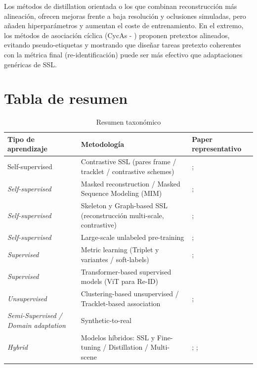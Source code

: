 Los métodos de distillation orientada o los que combinan reconstrucción más alineación, ofrecen mejoras frente a baja resolución y oclusiones simuladas, pero añaden hiperparámetros y aumentan el coste de entrenamiento. En el extremo, los métodos de asociación cíclica (CycAs - \cite{Gao2025CycAs}) proponen pretextos alineados, evitando pseudo-etiquetas y mostrando que diseñar tareas pretexto coherentes con la métrica final (re-identificación) puede ser más efectivo que adaptaciones genéricas de SSL.

\section{Tabla de resumen}
\begin{table}[H]
    \centering
    \caption{Resumen taxonómico}
    \small
    \begin{tabular}{p{2.8cm} p{5.2cm} p{5.2cm}}
    \hline
    \textbf{Tipo de aprendizaje} & \textbf{Metodología} & \textbf{Paper representativo} \\ \hline\hline

    Self-supervised
    & Contrastive SSL (pares frame / tracklet / contrastive schemes) 
    & \cite{Zheng2022PASS}; \cite{Dou2023IdentitySeeking} \\
    \hline

    \textit{Self-supervised}
    & Masked reconstruction / Masked Sequence Modeling (MIM) 
    & \cite{Han2021LocalitySGE}; \cite{Wang2025GaitForeMer} \\
    \hline

    \textit{Self-supervised}
    & Skeleton y Graph-based SSL (reconstrucción multi-scale, contrastive)
    & \cite{Han2021SMSGE}; \cite{Han2021LocalitySGE} \\
    \hline

    \textit{Self-supervised}
    & Large-scale unlabeled pre-training
    & \cite{Zheng2022GaitLU1M}; \cite{Xu2023VILLS} \\
    \hline

    \textit{Supervised}
    & Metric learning (Triplet y variantes / soft-labels) 
    & \cite{Lin2020Softened}; \cite{Guo2023TripletContrastive} \\
    \hline

    \textit{Supervised}
    & Transformer-based supervised models (ViT para Re-ID) 
    & \cite{Huang2025PersonViT} \\
    \hline

    \textit{Unsupervised}
    & Clustering-based unsupervised / Tracklet-based association 
    & \cite{Wu2020Tracklet}; \cite{Lin2020Softened} \\
    \hline

    \textit{Semi-Supervised / Domain adaptation}
    & Synthetic-to-real
    & \cite{Zhang2024SyntheticReID} \\
    \hline

    \textit{Hybrid}
    & Modelos híbridos: SSL y Fine-tuning / Distillation / Multi-scene
    & \cite{Dou2023IdentitySeeking}; \cite{Li2025OrientedKD}; \cite{Zhou2024VersReID} \\
    \hline
    \end{tabular}
    \label{tab:taxonomy_summary}
\end{table}

